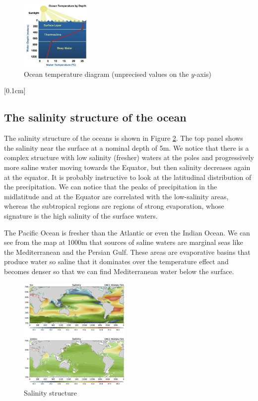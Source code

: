\begin{figure}
  \begin{center}
    \includegraphics[width=0.3\textwidth]{uploads/Ocean T.png}
  \end{center}
  \caption{Ocean temperature diagram (unprecised values on the $y$-axis)}
  \label{}
\end{figure}
[0.1cm]

\subsection{The salinity structure of the ocean }
The salinity structure of the oceans is shown in Figure \ref{fig:fig1}.  The top panel shows the salinity near the surface at a nominal depth of
5m. We notice that there is a complex structure with low salinity
(fresher) waters at the poles and progressively more saline water moving towards the Equator, but then salinity decreases again at the equator. It is probably instructive to look at the latitudinal distribution of the precipitation. We can notice that the peaks of precipitation in the midlatitude and at the Equator are correlated with the low-salinity areas, whereas the subtropical regions are regions of strong evaporation, whose signature is the high salinity of the surface waters.

The Pacific Ocean is fresher than the Atlantic or even the Indian Ocean.
We can see from the map at 1000m that sources of saline waters are
marginal seas like the Mediterranean and the Persian Gulf. These areas
are evaporative basins that produce water so saline that it dominates
over the temperature effect and becomes denser so that we can find
Mediterranean water below the surface.
\begin{figure}
  \begin{center}
    \includegraphics[width=0.48\textwidth]{uploads/26image.png}
  \end{center}
  \caption{Salinity structure}
  \label{fig:fig1}
\end{figure}


